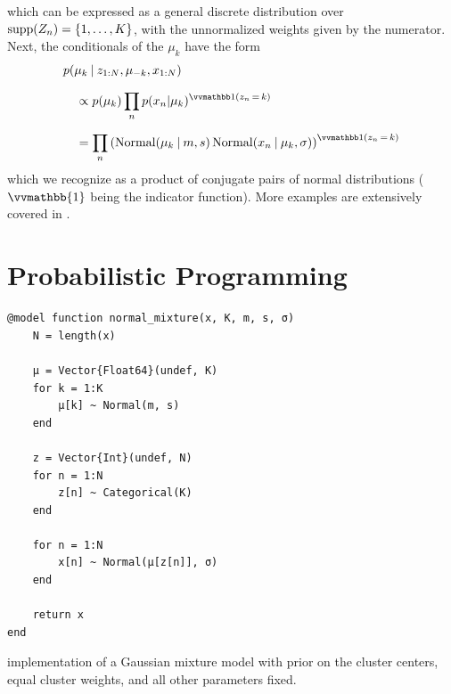 which can be expressed as a general discrete distribution over \(\operatorname{supp}(Z_{n}) = \{1, \ldots, K\}\),
with the unnormalized weights given by the numerator.  Next, the conditionals of the \(\mu_{k}\)
have the form
\begin{equation}
  \setlength{\jot}{0.8\baselineskip}
  \begin{aligned}
    &p(\mu_{k} \given z_{1:N}, \mu_{-k}, x_{1:N}) \\
    &\quad \propto p(\mu_k) \prod_{n} p(x_{n} | \mu_{k})^{\indicator{z_{n} \, = \, k}} \\
    &\quad = \prod_{n} \left( \Normal(\mu_{k} \given m, s) \,
      \Normal(x_{n} \given \mu_{k}, \sigma) \right)^{\indicator{z_{n} \, = \, k}}
  \end{aligned}
\end{equation}
which we recognize as a product of conjugate pairs of normal distributions (\(\vvmathbb{1}\) being the
indicator function).  More examples are extensively covered in \textcite[chapter
24.2]{murphy2012machine}.

\section{Probabilistic Programming}
\label{sec:prob-prog}

\begin{lstfloat}[t]
  \begin{lstlisting}[style=lstfloat]
@model function normal_mixture(x, K, m, s, σ)
    N = length(x)

    μ = Vector{Float64}(undef, K)
    for k = 1:K
        μ[k] ~ Normal(m, s)
    end

    z = Vector{Int}(undef, N)
    for n = 1:N
        z[n] ~ Categorical(K)
    end

    for n = 1:N
        x[n] ~ Normal(μ[z[n]], σ)
    end

    return x
end
\end{lstlisting}
    \caption{\turingjl{} implementation of a Gaussian mixture model with prior on the cluster centers,
    equal cluster weights, and all other parameters fixed.\label{lst:normal}}
\end{lstfloat}

